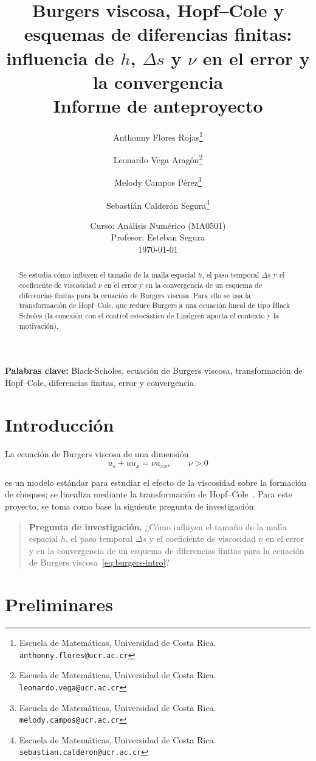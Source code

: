 \documentclass[11pt,letterpaper]{article}
\title{\textbf{Burgers viscosa, Hopf--Cole y esquemas de diferencias finitas:\\ influencia de \(h\), \(\Delta s\) y \(\nu\) en el error y la convergencia} \\[0.4em]
	\large Informe de anteproyecto}
\author{%
	{Anthonny Flores Rojas}\thanks{{Escuela de Matemáticas, Universidad de Costa Rica}. \texttt{anthonny.flores@ucr.ac.cr}} \and
	{Leonardo Vega Aragón}\thanks{{Escuela de Matemáticas, Universidad de Costa Rica}. \texttt{leonardo.vega@ucr.ac.cr}} \and
	{Melody Campos Pérez}\thanks{{Escuela de Matemáticas, Universidad de Costa Rica}. \texttt{melody.campos@ucr.ac.cr}} \and
	{Sebastián Calderón Segura}\thanks{{Escuela de Matemáticas, Universidad de Costa Rica}. \texttt{sebastian.calderon@ucr.ac.cr}}}
\date{Curso: Análisis Numérico (MA0501) \\
	Profesor: Esteban Segura \\[0.3em] \today}
\theoremstyle{plain}
\theoremstyle{definition}
\theoremstyle{remark}
\numberwithin{equation}{section}
\begin{document}
	
	\maketitle
	
	\begin{abstract}
		Se estudia cómo influyen el tamaño de la malla espacial \(h\), el paso temporal \(\Delta s\) y el coeficiente de viscosidad \(\nu\) en el error y en la convergencia de un esquema de diferencias finitas para la ecuación de Burgers viscosa. Para ello se usa la transformación de Hopf--Cole, que reduce Burgers a una ecuación lineal de tipo Black--Scholes (la conexión con el control estocástico de Lindgren aporta el contexto y la motivación).
	\end{abstract}
	
	\medskip
	
	
	\noindent\textbf{Palabras clave:} Black-Scholes, ecuación de Burgers viscosa, transformación de Hopf--Cole, diferencias finitas, error y convergencia.
	
	\section{Introducción}\label{sec:intro}
	
	La ecuación de Burgers viscosa de una dimensión
	\begin{equation}\label{eq:burgers-intro}
		u_s + uu_x = \nu u_{xx}, \qquad \nu > 0
	\end{equation} 
	
	es un modelo estándar para estudiar el efecto de la viscosidad sobre la formación de choques; se linealiza mediante la transformación de Hopf--Cole~\cite{Hopf1950,Cole1951}. Para este proyecto, se toma como base la siguiente pregunta de investigación:
	
	\begin{quote}
		\textbf{Pregunta de investigación.} ¿Cómo influyen el tamaño de la malla espacial \(h\), el paso temporal \(\Delta s\) y el coeficiente de viscosidad \(\nu\) en el error y en la convergencia de un esquema de diferencias finitas para la ecuación de Burgers viscosa~\eqref{eq:burgers-intro}?
	\end{quote}
	
	\section{Preliminares}\label{sec:prelim}
	
\end{document}

